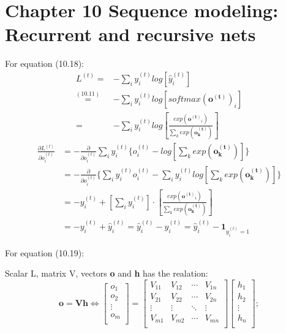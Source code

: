 \documentclass[12pt]{article}
\numberwithin{equation}{section}
\begin{document}
\section{Chapter 10 Sequence modeling: Recurrent and recursive nets}
For equation (10.18):
\begin{align*}
L^{(t)} =& -\sum_{i}y_{i}^{(t)}log[\hat{y}_{i}^{(t)}] \\
\overset{(10.11)}{=}& -\sum_{i}y_{i}^{(t)}log[softmax(\mathbf{o^{(t)}})_{i}] \\
=& -\sum_{i}y_{i}^{(t)}log[\frac{exp(\mathbf{o^{(t)}}_{i})}{\sum_{k}exp(\mathbf{o^{(t)}_{k}})}]
\end{align*}
\begin{align*}
\frac{\partial L^{(t)}}{\partial o_i^{(t)}}
&=-\frac{\partial}{\partial o_i^{(t)}} \sum_{i}y_{i}^{(t)} \{o_i^{(t)}-log[\sum_{k}exp(\mathbf{o^{(t)}_{k}})] \}\\
&=-\frac{\partial}{\partial o_i^{(t)}} \{\sum_{i}y_{i}^{(t)} o_i^{(t)}-\sum_{i}y_{i}^{(t)} log[\sum_{k}exp(\mathbf{o^{(t)}_{k}})] \}\\
&=-y_{i}^{(t)} + [\sum_{i}y_{i}^{(t)}] \cdot [\frac{exp(\mathbf{o^{(t)}}_{i})}{\sum_{k}exp(\mathbf{o^{(t)}_{k}})}]\\
&=-y_{i}^{(t)} + \hat{y}_{i}^{(t)} = \hat{y}_{i}^{(t)} - y_{i}^{(t)} =  \hat{y}_{i}^{(t)} - \mathbf{1}_{y_{i}^{(t)}=1}
\end{align*}

For equation (10.19):

Scalar L, matrix V, vectors \textbf{o} and \textbf{h} has the realation:  
\[
\mathbf{o}=\mathbf{Vh} \Leftrightarrow
\begin{bmatrix}
o_1\\ o_2\\ \vdots\\ o_m\\
\end{bmatrix}=
\begin{bmatrix}
V_{11} & V_{12} & \cdots & V_{1n}\\
V_{21} & V_{22} & \cdots & V_{2n}\\
\vdots & \vdots & \ddots & \vdots\\
V_{m1} & V_{m2} & \cdots & V_{mn}\\
\end{bmatrix}
\begin{bmatrix}
h_1\\ h_2\\ \vdots\\ h_n\\
\end{bmatrix};
\]
\end{document}

